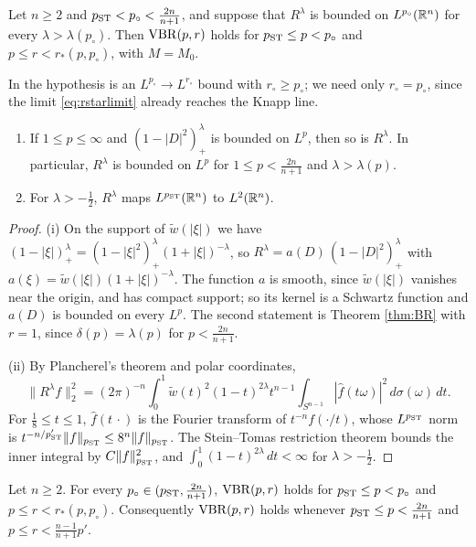 \begin{theorem}\label{thm:vbr}
Let $n\ge2$ and $p_{\rm ST}<p_\circ<\frac{2n}{n+1}$, and suppose that $R^\lambda$ is bounded on
$L^{p_\circ}(\mathbb{R}^n)$ for every $\lambda>\lambda(p_\circ)$. Then $\mathrm{VBR}(p,r)$ holds for
$p_{\rm ST}\le p<p_\circ$ and $p\le r<r_*(p,p_\circ)$, with $M=M_0$.
\end{theorem}

In \cite{BRS23} the hypothesis is an $L^{p_\circ}\to L^{r_\circ}$ bound with $r_\circ\ge p_\circ$; we
need only $r_\circ=p_\circ$, since the limit \eqref{eq:rstarlimit} already reaches the Knapp line.

\begin{lemma}\label{lem:riesz}
\begin{enumerate}[label=\textup{(\roman*)}]
\item If $1\le p\le\infty$ and $(1-|D|^2)^\lambda_+$ is bounded on $L^p$, then so is $R^\lambda$. In
particular, $R^\lambda$ is bounded on $L^p$ for $1\le p<\frac{2n}{n+1}$ and $\lambda>\lambda(p)$.
\item For $\lambda>-\frac12$, $R^\lambda$ maps $L^{p_{\rm ST}}(\mathbb{R}^n)$ to $L^2(\mathbb{R}^n)$.
\end{enumerate}
\end{lemma}

\begin{proof}
(i) On the support of $\tilde w(|\xi|)$ we have $(1-|\xi|)^\lambda_+=(1-|\xi|^2)^\lambda_+(1+|\xi|)^{-\lambda}$, so
$R^\lambda=a(D)\,(1-|D|^2)^\lambda_+$ with $a(\xi)=\tilde w(|\xi|)(1+|\xi|)^{-\lambda}$. The function $a$ is smooth,
since $\tilde w(|\xi|)$ vanishes near the origin, and has compact support; so its kernel is a Schwartz
function and $a(D)$ is bounded on every $L^p$. The second statement is Theorem \ref{thm:BR} with $r=1$,
since $\delta(p)=\lambda(p)$ for $p<\frac{2n}{n+1}$.

(ii) By Plancherel's theorem and polar coordinates,
\[
\|R^\lambda f\|_2^2=(2\pi)^{-n}\int_0^1\tilde w(t)^2(1-t)^{2\lambda}t^{n-1}\int_{S^{n-1}}|\hat f(t\omega)|^2\,d\sigma(\omega)\,dt .
\]
For $\frac18\le t\le1$, $\hat f(t\,\cdot)$ is the Fourier transform of $t^{-n}f(\cdot/t)$, whose
$L^{p_{\rm ST}}$ norm is $t^{-n/p_{\rm ST}'}\|f\|_{p_{\rm ST}}\le 8^n\|f\|_{p_{\rm ST}}$. The Stein--Tomas
restriction theorem \cite[Ch.~IX, \S2.1]{Ste93} bounds the inner integral by $C\|f\|_{p_{\rm ST}}^2$, and
$\int_0^1(1-t)^{2\lambda}\,dt<\infty$ for $\lambda>-\frac12$.
\end{proof}

\begin{corollary}\label{cor:vbr}
Let $n\ge2$. For every $p_\circ\in(p_{\rm ST},\frac{2n}{n+1})$, $\mathrm{VBR}(p,r)$ holds for $p_{\rm ST}\le p<p_\circ$
and $p\le r<r_*(p,p_\circ)$. Consequently $\mathrm{VBR}(p,r)$ holds whenever $p_{\rm ST}\le p<\frac{2n}{n+1}$ and
$p\le r<\frac{n-1}{n+1}p'$.
\end{corollary}

